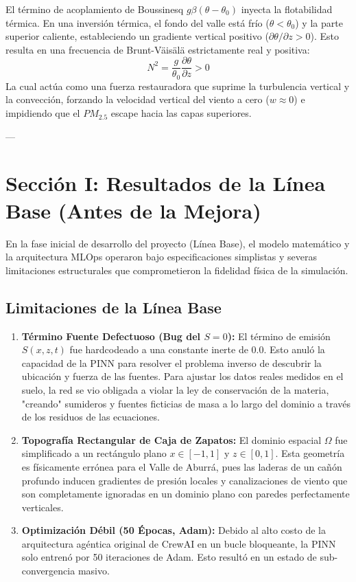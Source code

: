 \documentclass[11pt,a4paper]{article}
\begin{document}
El término de acoplamiento de Boussinesq $g\beta(\theta - \theta_0)$ inyecta la flotabilidad térmica. En una inversión térmica, el fondo del valle está frío ($\theta < \theta_0$) y la parte superior caliente, estableciendo un gradiente vertical positivo ($\partial \theta / \partial z > 0$). Esto resulta en una frecuencia de Brunt-Väisälä estrictamente real y positiva:
\begin{equation}
N^2 = \frac{g}{\theta_0} \frac{\partial \theta}{\partial z} > 0
\end{equation}
La cual actúa como una fuerza restauradora que suprime la turbulencia vertical y la convección, forzando la velocidad vertical del viento a cero ($w \approx 0$) e impidiendo que el $PM_{2.5}$ escape hacia las capas superiores.

---

\section*{Sección I: Resultados de la Línea Base (Antes de la Mejora)}
En la fase inicial de desarrollo del proyecto (Línea Base), el modelo matemático y la arquitectura MLOps operaron bajo especificaciones simplistas y severas limitaciones estructurales que comprometieron la fidelidad física de la simulación.

\subsection{Limitaciones de la Línea Base}
\begin{enumerate}
    \item \textbf{Término Fuente Defectuoso (Bug del $S = 0$):} El término de emisión $S(x, z, t)$ fue hardcodeado a una constante inerte de $0.0$. Esto anuló la capacidad de la PINN para resolver el problema inverso de descubrir la ubicación y fuerza de las fuentes. Para ajustar los datos reales medidos en el suelo, la red se vio obligada a violar la ley de conservación de la materia, "creando" sumideros y fuentes ficticias de masa a lo largo del dominio a través de los residuos de las ecuaciones.
    \item \textbf{Topografía Rectangular de Caja de Zapatos:} El dominio espacial $\Omega$ fue simplificado a un rectángulo plano $x \in [-1, 1]$ y $z \in [0, 1]$. Esta geometría es físicamente errónea para el Valle de Aburrá, pues las laderas de un cañón profundo inducen gradientes de presión locales y canalizaciones de viento que son completamente ignoradas en un dominio plano con paredes perfectamente verticales.
    \item \textbf{Optimización Débil (50 Épocas, Adam):} Debido al alto costo de la arquitectura agéntica original de CrewAI en un bucle bloqueante, la PINN solo entrenó por 50 iteraciones de Adam. Esto resultó en un estado de sub-convergencia masivo.
\end{enumerate}
\end{document}

